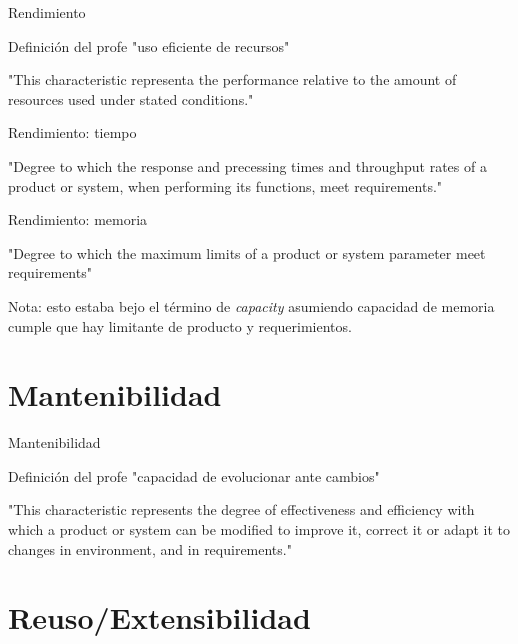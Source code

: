 \begin{frame}{Rendimiento}
    \begin{block}{Definición del profe}
        "\space uso eficiente de recursos"
    \end{block}
    \begin{alertblock}{\cite{ISO25010}}
        "This characteristic representa the performance relative to the amount of resources used under stated conditions."
    \end{alertblock}
\end{frame}

\begin{frame}{Rendimiento: tiempo}
    \begin{block}{\cite{ISO25010}}
        "Degree to which the response and precessing times and throughput rates of a product or system, when performing its functions, meet requirements."
    \end{block}
\end{frame}

\begin{frame}{Rendimiento: memoria}
    \begin{block}{\cite{ISO25010}}
        "Degree to which the maximum limits of a product or system parameter meet requirements"
    \end{block}
    Nota: esto estaba bejo el término de \textit{capacity} asumiendo capacidad de memoria cumple que hay limitante de producto y requerimientos.
\end{frame}

\section{Mantenibilidad}

\begin{frame}{Mantenibilidad}
    \begin{block}{Definición del profe}
        "\space capacidad de evolucionar ante cambios"
    \end{block}
    \begin{alertblock}{\cite{ISO25010}}
        "This characteristic represents the degree of effectiveness and efficiency with which a product or system can be modified to improve it, correct it or adapt it to changes in environment, and in requirements."
    \end{alertblock}
\end{frame}

\section{Reuso/Extensibilidad}

